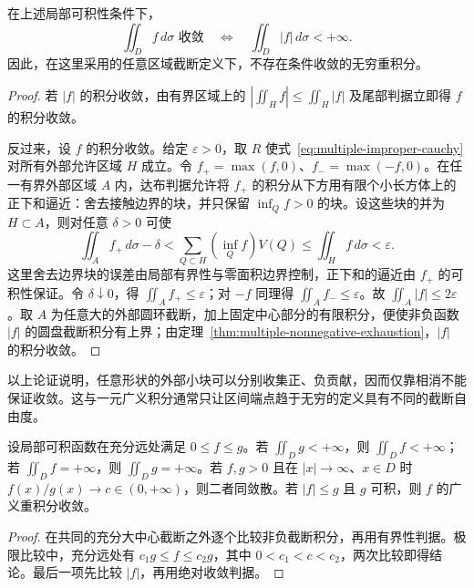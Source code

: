 \documentclass[UTF8,12pt,a4paper,fontset=fandol]{ctexbook}
\begin{document}
\begin{theorem}[收敛与绝对收敛等价]
\label{thm:multiple-improper-absolute}
在上述局部可积性条件下，
\begin{equation}
    \iint_Df\,d\sigma\text{ 收敛}
    \quad\Longleftrightarrow\quad
    \iint_D|f|\,d\sigma<+\infty.
    \label{eq:multiple-improper-absolute}
\end{equation}
因此，在这里采用的任意区域截断定义下，不存在条件收敛的无穷重积分。
\end{theorem}
\begin{proof}
若 $|f|$ 的积分收敛，由有界区域上的 $|\iint_Hf|\leq\iint_H|f|$ 及尾部判据立即得 $f$ 的积分收敛。

反过来，设 $f$ 的积分收敛。给定 $\varepsilon>0$，取 $R$ 使式~\eqref{eq:multiple-improper-cauchy} 对所有外部允许区域 $H$ 成立。令 $f_+=\max(f,0)$、$f_-=\max(-f,0)$。在任一有界外部区域 $A$ 内，达布判据允许将 $f_+$ 的积分从下方用有限个小长方体上的正下和逼近：舍去接触边界的块，并只保留 $\inf_Q f>0$ 的块。设这些块的并为 $H\subset A$，则对任意 $\delta>0$ 可使
\[
    \iint_Af_+\,d\sigma-\delta
    <\sum_{Q\subset H}(\inf_Q f)V(Q)
    \leq\iint_Hf\,d\sigma<\varepsilon.
\]
这里舍去边界块的误差由局部有界性与零面积边界控制，正下和的逼近由 $f_+$ 的可积性保证。令 $\delta\downarrow0$，得 $\iint_Af_+\leq\varepsilon$；对 $-f$ 同理得 $\iint_Af_-\leq\varepsilon$。故 $\iint_A|f|\leq2\varepsilon$。取 $A$ 为任意大的外部圆环截断，加上固定中心部分的有限积分，便使非负函数 $|f|$ 的圆盘截断积分有上界；由定理~\ref{thm:multiple-nonnegative-exhaustion}，$|f|$ 的积分收敛。
\end{proof}

以上论证说明，任意形状的外部小块可以分别收集正、负贡献，因而仅靠相消不能保证收敛。这与一元广义积分通常只让区间端点趋于无穷的定义具有不同的截断自由度。

\begin{proposition}[比较判别法]
\label{prop:multiple-improper-comparison}
设局部可积函数在充分远处满足 $0\leq f\leq g$。若 $\iint_Dg<+\infty$，则 $\iint_Df<+\infty$；若 $\iint_Df=+\infty$，则 $\iint_Dg=+\infty$。若 $f,g>0$ 且在 $|x|\to\infty$、$x\in D$ 时 $f(x)/g(x)\to c\in(0,+\infty)$，则二者同敛散。若 $|f|\leq g$ 且 $g$ 可积，则 $f$ 的广义重积分收敛。
\end{proposition}
\begin{proof}
在共同的充分大中心截断之外逐个比较非负截断积分，再用有界性判据。极限比较中，充分远处有 $c_1g\leq f\leq c_2g$，其中 $0<c_1<c<c_2$，两次比较即得结论。最后一项先比较 $|f|$，再用绝对收敛判据。
\end{proof}
\end{document}

